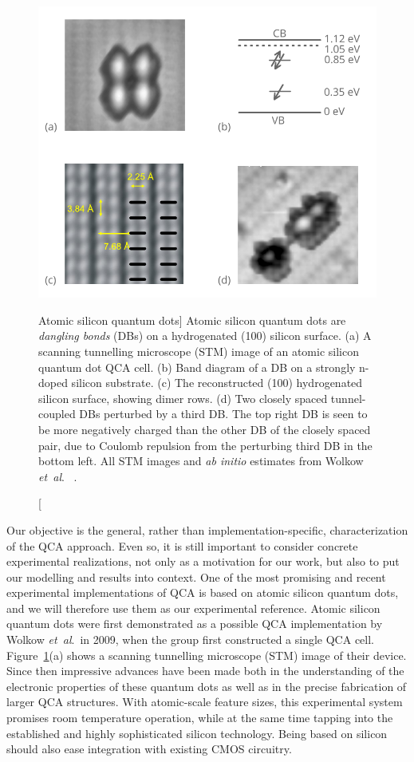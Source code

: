 \begin{figure}
  \center
  \includegraphics{silicon}
  \caption
[Atomic silicon quantum dots]
{
Atomic silicon quantum dots are \emph{dangling bonds} (DBs) on a hydrogenated
(100) silicon surface. (a) A scanning tunnelling microscope (STM) image of an
atomic silicon quantum dot QCA cell. (b) Band diagram of a DB on a strongly
n-doped silicon substrate. (c) The reconstructed (100) hydrogenated silicon
surface, showing dimer rows. (d) Two closely spaced tunnel-coupled DBs perturbed
by a third DB. The top right DB is seen to be more negatively charged than the
other DB of the closely spaced pair, due to Coulomb repulsion from the
perturbing third DB in the bottom left. All STM images and \emph{ab initio}
estimates from Wolkow \emph{et~al}.\ \cite{wolkow2013silicon} \cite{pitters2011tunnel}.
}
  \label{fig:silicon}
\end{figure}

Our objective is the general, rather than implementation-specific,
characterization of the QCA approach. Even so, it is still important to consider
concrete experimental realizations, not only as a motivation for our work, but
also to put our modelling and results into context. One of the most promising
and recent experimental implementations of QCA is based on atomic silicon
quantum dots, and we will therefore use them as our experimental reference.
Atomic silicon quantum dots were first demonstrated as a possible QCA
implementation by Wolkow \emph{et~al}.\ in 2009, when the group first
constructed a
single QCA cell. Figure~\ref{fig:silicon}(a) shows a scanning tunnelling
microscope (STM) image of their device. Since then impressive advances have been
made both in the understanding of the electronic properties of these quantum
dots as well as in the precise fabrication of larger QCA structures. With
atomic-scale feature sizes, this experimental system promises room temperature
operation, while at the same time tapping into the established and highly
sophisticated silicon technology. Being based on silicon should also ease
integration with existing CMOS circuitry.

